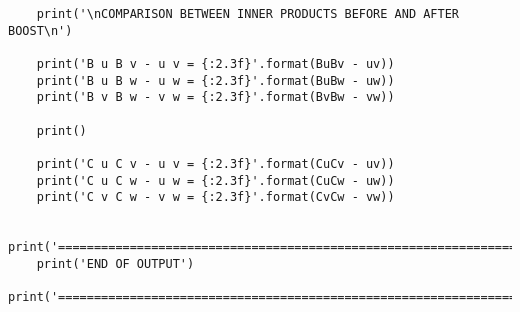 \documentclass[12pt]{report}
\begin{document}
\begin{verbatim}
	print('\nCOMPARISON BETWEEN INNER PRODUCTS BEFORE AND AFTER BOOST\n')
	
	print('B u B v - u v = {:2.3f}'.format(BuBv - uv))
	print('B u B w - u w = {:2.3f}'.format(BuBw - uw))
	print('B v B w - v w = {:2.3f}'.format(BvBw - vw))
	
	print()
	
	print('C u C v - u v = {:2.3f}'.format(CuCv - uv))
	print('C u C w - u w = {:2.3f}'.format(CuCw - uw))
	print('C v C w - v w = {:2.3f}'.format(CvCw - vw))
	
	print('======================================================================')
	print('END OF OUTPUT')
	print('======================================================================')
	
\end{verbatim}
\end{document}
